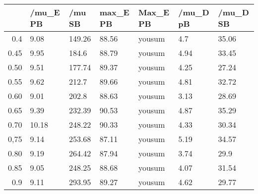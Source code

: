 \begin{table}[ht]
\centering
\begin{tabular}{rllllll}
  \hline
 & /mu\_E PB & /mu SB & max\_E PB & Max\_E PB & /mu\_D pB & /mu\_D SB \\ 
  \hline
0.4 & 9.08 & 149.26 & 88.56 & yousum & 4.7 & 35.06 \\ 
  0.45 & 9.95 & 184.6 & 88.79 & yousum & 4.94 & 33.45 \\ 
  0.50 & 9.51 & 177.74 & 89.37 & yousum & 4.25 & 27.24 \\ 
  0.55 & 9.62 & 212.7 & 89.66 & yousum & 4.81 & 32.72 \\ 
  0.60 & 9.01 & 202.8 & 88.63 & yousum & 3.13 & 28.69 \\ 
  0.65 & 9.39 & 232.39 & 90.53 & yousum & 4.87 & 35.29 \\ 
  0.70 & 10.18 & 248.22 & 90.33 & yousum & 4.33 & 30.34 \\ 
  0,75 & 9.14 & 253.68 & 87.11 & yousum & 5.19 & 34.57 \\ 
  0.80 & 9.19 & 264.42 & 87.94 & yousum & 3.74 & 29.9 \\ 
  0.85 & 9.05 & 248.25 & 88.68 & yousum & 4.07 & 31.54 \\ 
  0.9 & 9.11 & 293.95 & 89.27 & yousum & 4.62 & 29.77 \\ 
   \hline
\end{tabular}
\end{table}
